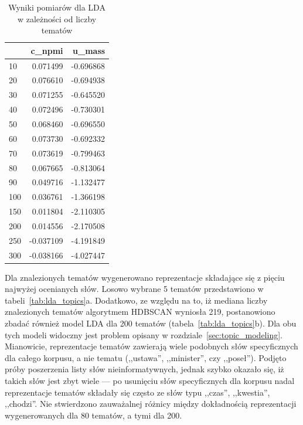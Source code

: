 	\begin{table}[htb]
		\centering
		\caption{Wyniki pomiarów dla LDA w zależności od liczby tematów}\label{tab:lda_scores}
		\begin{tabular}{lrr}
			\toprule
			{} &    c\_npmi &    u\_mass \\
			\midrule
			10  &  0.071499 & -0.696868 \\
			20  &  0.076610 & -0.694938 \\
			30  &  0.071255 & -0.645520 \\
			40  &  0.072496 & -0.730301 \\
			50  &  0.068460 & -0.696550 \\
			60  &  0.073730 & -0.692332 \\
			70  &  0.073619 & -0.799463 \\
			80  &  0.067665 & -0.813064 \\
			90  &  0.049716 & -1.132477 \\
			100 &  0.036761 & -1.366198 \\
			150 &  0.011804 & -2.110305 \\
			200 &  0.014556 & -2.170508 \\
			250 & -0.037109 & -4.191849 \\
			300 & -0.038166 & -4.027447 \\
			\bottomrule
			\end{tabular}			
	\end{table}

	Dla znalezionych tematów wygenerowano reprezentacje składające się z pięciu najwyżej ocenianych słów.
	Losowo wybrane 5 tematów przedstawiono w tabeli~\ref{tab:lda_topics}a.
	Dodatkowo, ze względu na to, iż mediana liczby znalezionych tematów algorytmem HDBSCAN wyniosła 219,
		postanowiono zbadać również model LDA dla 200 tematów (tabela~\ref{tab:lda_topics}b).
	Dla obu tych modeli widoczny jest problem opisany w rozdziale~\ref{sec:topic_modeling}.
	Mianowicie, reprezentacje tematów zawierają wiele podobnych słów specyficznych dla całego korpusu, a nie tematu (,,ustawa'', ,,minister'', czy ,,poseł'').
	Podjęto próby poszerzenia listy słów nieinformatywnych, jednak szybko okazało się, iż takich słów jest zbyt wiele
		--- po usunięciu słów specyficznych dla korpusu nadal reprezentacje tematów składały się często ze słów typu ,,czas'', ,,kwestia'', ,,chodzi''.
	Nie stwierdzono zauważalnej różnicy między dokładnością reprezentacji wygenerowanych dla 80 tematów, a tymi dla 200.
	
